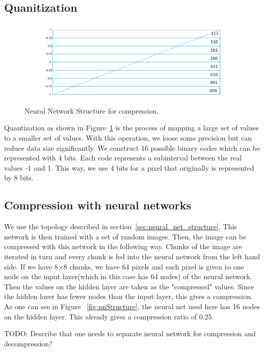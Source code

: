 \subsection{Quanitization}
\label{sec:quanitization}
\begin{figure}[tbp]
  \centering
  \includegraphics[width=\columnwidth]{images/bqQuantizer}
  \caption{Neural Network Structure for compression.}
  \label{fig:bpQuantizer}
\end{figure}

Quantization as shown in Figure~\ref{fig:bpQuantizer} is the process of mapping a large set of values to a smaller set of values. With this operation, we loose some precision but can reduce data size significantly. We construct 16 possible binary codes which can be represented with 4 bits. Each code represents a subinterval between the real values -1 and 1. This way, we use 4 bits for a pixel that originally is represented by 8 bits.  

\subsection{Compression with neural networks}
We use the topology described in section~\ref{sec:neural_net_structure}. This network is then trained with a set of random images. Then, the image can be compressed with this network in the following way. Chunks of the image are iterated in turn and every chunk is fed into the neural network from the left hand side. If we have 8$\times$8 chunks, we have 64 pixels and each pixel is given to one node on the input layer(which in this case has 64 nodes) of the neural network. Then the values on the hidden layer are taken as the "compressed" values. Since the hidden layer has fewer nodes than the input layer, this gives a compression. As one can see in Figure ~\ref{fig:nnStructure}, the neural net used here has 16 nodes on the hidden layer. This already gives a compression ratio of 0.25. 

TODO: Describe that one needs to separate neural network for compression and decompression?

